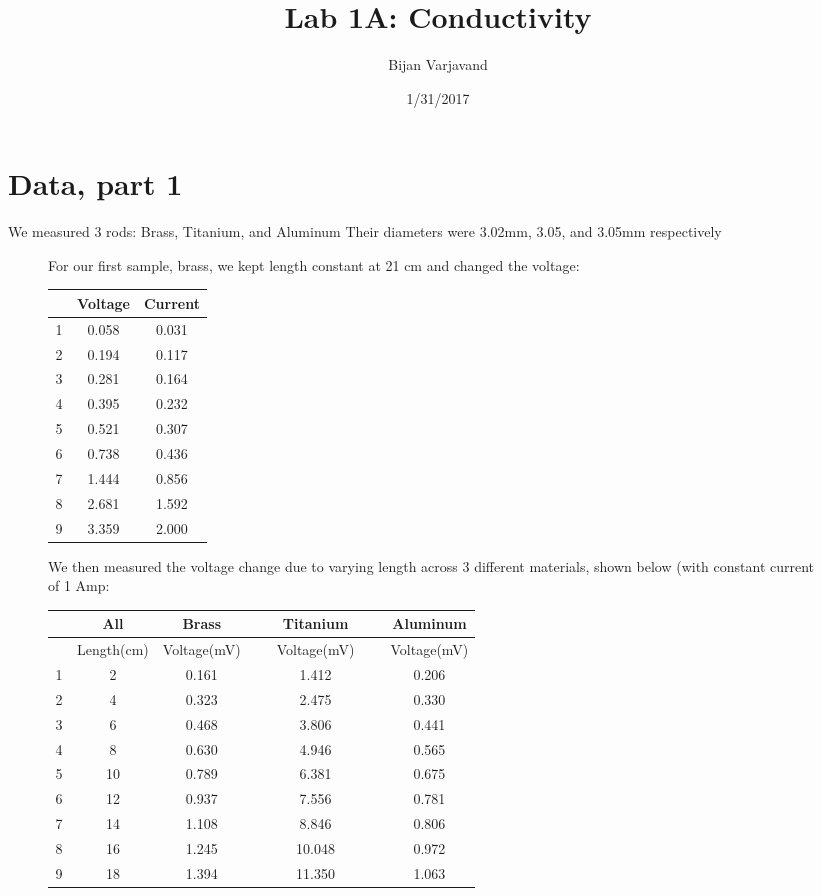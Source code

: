 \documentclass{article}
\title{Lab 1A: Conductivity}
\author{Bijan Varjavand}
\date{1/31/2017}
\begin{document}
\maketitle
\section{Data, part 1}
We measured 3 rods: Brass, Titanium, and Aluminum
Their diameters were 3.02mm, 3.05, and 3.05mm respectively
\begin{figure}
	For our first sample, brass, we kept length constant at 21 cm and changed the voltage:
	
	\centering
	\begin{tabular}{|c|c|c|}
	\hline	
	\ & Voltage & Current\\
	\hline
	\hline
	1 & 0.058 & 0.031\\
	\hline
	2 & 0.194 & 0.117\\
	\hline
	3 & 0.281 & 0.164\\
	\hline
	4 & 0.395 & 0.232\\
	\hline
	5 & 0.521 & 0.307\\
	\hline
	6 & 0.738 & 0.436\\
	\hline
	7 & 1.444 & 0.856\\
	\hline
	8 & 2.681 & 1.592\\
	\hline
	9 & 3.359 & 2.000\\
	\hline
	\end{tabular}
\end{figure}
\begin{figure}
	We then measured the voltage change due to varying length across 3 different materials, shown below (with constant current of 1 Amp:
	\centering
	\begin{tabular}{|c|c|c|c|c|c|c|}
		\hline
		\ & All & Brass & \ & Titanium & \ & Aluminum\\
		\hline
		\ & Length(cm) & Voltage(mV) & \ & Voltage(mV)	& \ &  Voltage(mV)\\
		\hline
		\hline
		1 & 2 & 0.161 & \ & 1.412 & \ & 0.206\\
		\hline
		2 & 4 & 0.323 & \ & 2.475 & \ & 0.330\\
		\hline
		3 & 6 & 0.468 & \ & 3.806 & \ & 0.441\\
		\hline
		4 & 8 & 0.630 & \ & 4.946 & \ & 0.565\\
		\hline
		5 & 10 & 0.789 & \ & 6.381 & \ & 0.675\\
		\hline
		6 & 12 & 0.937 & \ & 7.556 & \ & 0.781\\
		\hline
		7 & 14 & 1.108 & \ & 8.846 & \ & 0.806\\
		\hline
		8 & 16 & 1.245 & \ & 10.048 & \ & 0.972\\
		\hline
		9 & 18 & 1.394 & \ & 11.350 & \ & 1.063\\
		\hline
	\end{tabular}
\end{figure}
\end{document}
